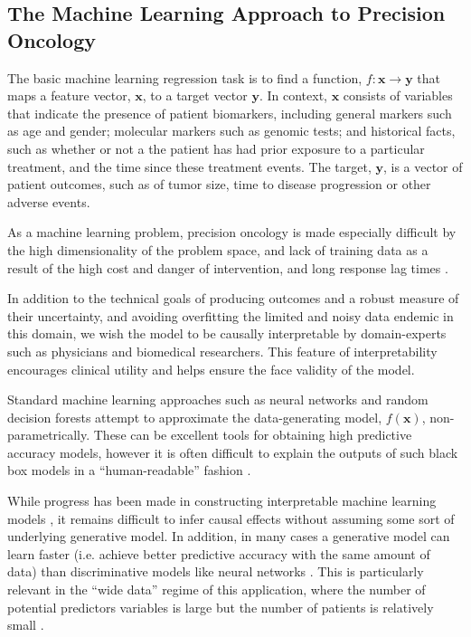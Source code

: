 \documentclass[twocolumn]{bmcart}%
\def\v#1{\bm{#1}}
\begin{document}
\subsection{The Machine Learning Approach to Precision Oncology}\label{sec:MLapproach}

The basic machine learning regression task is to find a function,
$f: \v x \rightarrow \v y$
that maps a feature vector, $\v x$,
to a target vector $\v y$.
In context, $\v x$
consists of variables that indicate the presence of patient biomarkers,
including general markers such as age and gender; molecular markers such as
genomic tests; and historical facts, such as whether or not a the patient has
had prior exposure to a particular treatment, and the time since these
treatment events. The target, $\v y$,
is a vector of patient outcomes, such as of tumor size, time to disease
progression or other adverse events.

As a machine learning problem, precision oncology is made especially difficult
by the high dimensionality of the problem space, and lack of training data as a
result of the high cost and danger of intervention, and long response lag
times \citep{shrager2019}.


In addition to the technical goals of producing outcomes and a robust measure
of their uncertainty, and avoiding overfitting the limited and noisy data
endemic in this domain, we wish the model to be causally interpretable by
domain-experts such as physicians and biomedical researchers.  This feature of
interpretability encourages clinical utility and helps ensure the face validity
of the model.

Standard machine learning approaches such as neural networks and random
decision forests attempt to approximate the data-generating model, $f(\v x)$,
non-parametrically.  These can be excellent tools for obtaining high predictive
accuracy models, however it is often difficult to explain the outputs of such
black box models in a ``human-readable'' fashion \citep{miller2017,
  molnar2019}.  

While progress has been made in constructing interpretable machine learning
models \citep[e.g.,][]{benitez1997, caruana2015, ribeiro2016, barratt2017,
  lundberg2017}, it remains difficult to infer causal effects without assuming
some sort of underlying generative model.  In addition, in many cases a
generative model can learn faster (i.e. achieve better predictive accuracy with
the same amount of data) than discriminative models like neural networks
\citep{ng2002}.  This is particularly relevant in the ``wide data'' regime of
this application, where the number of potential predictors variables is large
but the number of patients is relatively small \citep{shrager2019}.
\end{document}
